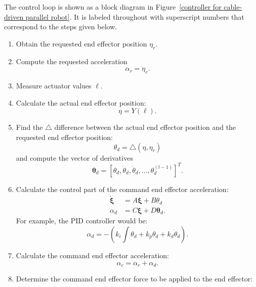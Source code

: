 \documentclass[reqno,twocolumn]{amsart}
\newcommand\tint{{\textstyle\int\!}}
\newcommand{\liediff}{\mathbin{\triangle}}
\renewcommand{\mathsf}{}
\begin{document}
The control loop is shown as a block diagram in Figure~\ref{controller for cable-driven parallel robot}.  It is labeled throughout with superscript numbers that correspond to the steps given below.
\begin{enumerate}
\item \label{first step alg} Obtain the requested end effector position $\eta_r$.
\item \label{second derivative} Compute the requested acceleration
\begin{equation}
\alpha_r = \ddot\eta_r .
\end{equation}
\item \label{measure} Measure actuator values $\bm\ell$.
\item \label{forward kinematics} Calculate the actual end effector position:
\begin{equation}
\eta = \mathsf Y(\bm\ell).
\end{equation}
\item \label{liediff}
Find the $\liediff$ difference between the actual end effector position and the requested end effector position:
\begin{equation}
\label{theta_d from liediff}
\theta_d = \liediff(\eta, \eta_r)
\end{equation}
and compute the vector of derivatives
\begin{equation}
\bm \theta_d = [\theta_d, \dot \theta_d, \ddot \theta_d, \dots, \theta_d^{(l-1)}]^T .
\end{equation}
\item \label{cable control} Calculate the control part of the command end effector acceleration:
\begin{align}
\label{closed-loop feed-forward robot alpha}
\dot{\bm \xi} &= \mathsf A \bm \xi + \mathsf B \theta_d \\
\label{closed-loop feed-forward robot alpha 2}
\alpha_d &= \mathsf C \bm \xi + \mathsf D \bm \theta_d.
\end{align}
For example, the PID controller would be:
\begin{equation}
\alpha_d = - (k_i \tint \theta_d + k_p \theta_d + k_d \dot \theta_d).
\end{equation}
\item \label{add requested acceleration to control} Calculate the command end effector acceleration:
\begin{equation}
\alpha_c = \alpha_r + \alpha_d.
\end{equation}
\item \label{determine torque-force} Determine the command end effector force to be applied to the end effector:

\end{enumerate}
\end{document}
